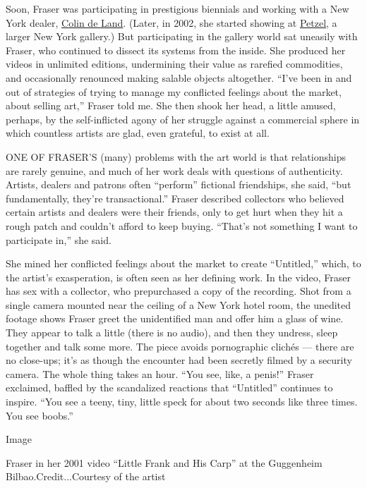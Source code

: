 Soon, Fraser was participating in prestigious biennials and working with
a New York dealer,
\href{https://www.nytimes3xbfgragh.onion/2003/03/06/arts/colin-de-land-47-art-dealer-who-fostered-experimentation.html}{Colin
de Land}. (Later, in 2002, she started showing at
\href{http://www.petzel.com/}{Petzel}, a larger New York gallery.) But
participating in the gallery world sat uneasily with Fraser, who
continued to dissect its systems from the inside. She produced her
videos in unlimited editions, undermining their value as rarefied
commodities, and occasionally renounced making salable objects
altogether. ``I've been in and out of strategies of trying to manage my
conflicted feelings about the market, about selling art,'' Fraser told
me. She then shook her head, a little amused, perhaps, by the
self-inflicted agony of her struggle against a commercial sphere in
which countless artists are glad, even grateful, to exist at all.

ONE OF FRASER'S (many) problems with the art world is that relationships
are rarely genuine, and much of her work deals with questions of
authenticity. Artists, dealers and patrons often ``perform'' fictional
friendships, she said, ``but fundamentally, they're transactional.''
Fraser described collectors who believed certain artists and dealers
were their friends, only to get hurt when they hit a rough patch and
couldn't afford to keep buying. ``That's not something I want to
participate in,'' she said.

She mined her conflicted feelings about the market to create
``Untitled,'' which, to the artist's exasperation, is often seen as her
defining work. In the video, Fraser has sex with a collector, who
prepurchased a copy of the recording. Shot from a single camera mounted
near the ceiling of a New York hotel room, the unedited footage shows
Fraser greet the unidentified man and offer him a glass of wine. They
appear to talk a little (there is no audio), and then they undress,
sleep together and talk some more. The piece avoids pornographic clichés
--- there are no close-ups; it's as though the encounter had been
secretly filmed by a security camera. The whole thing takes an hour.
``You see, like, a penis!'' Fraser exclaimed, baffled by the scandalized
reactions that ``Untitled'' continues to inspire. ``You see a teeny,
tiny, little speck for about two seconds like three times. You see
boobs.''

Image

Fraser in her 2001 video ``Little Frank and His Carp'' at the Guggenheim
Bilbao.Credit...Courtesy of the artist


